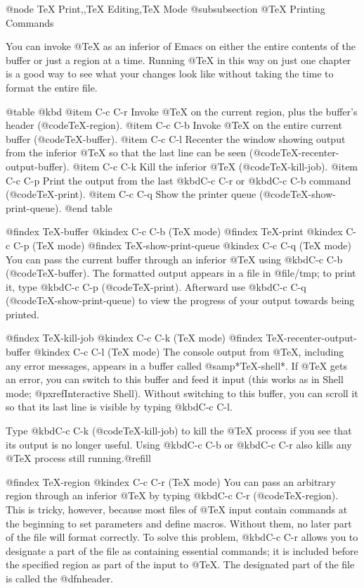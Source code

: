 {{{{{{{{{{{{{{{{{{{{@node TeX Print,,TeX Editing,TeX Mode
@subsubsection @TeX{} Printing Commands

  You can invoke @TeX{} as an inferior of Emacs on either the entire
contents of the buffer or just a region at a time.  Running @TeX{} in
this way on just one chapter is a good way to see what your changes
look like without taking the time to format the entire file.

@table @kbd
@item C-c C-r
Invoke @TeX{} on the current region, plus the buffer's header
(@code{TeX-region}).
@item C-c C-b
Invoke @TeX{} on the entire current buffer (@code{TeX-buffer}).
@item C-c C-l
Recenter the window showing output from the inferior @TeX{} so that
the last line can be seen (@code{TeX-recenter-output-buffer}).
@item C-c C-k
Kill the inferior @TeX{} (@code{TeX-kill-job}).
@item C-c C-p
Print the output from the last @kbd{C-c C-r} or @kbd{C-c C-b} command
(@code{TeX-print}).
@item C-c C-q
Show the printer queue (@code{TeX-show-print-queue}).
@end table

@findex TeX-buffer
@kindex C-c C-b (TeX mode)
@findex TeX-print
@kindex C-c C-p (TeX mode)
@findex TeX-show-print-queue
@kindex C-c C-q (TeX mode)
  You can pass the current buffer through an inferior @TeX{} using
@kbd{C-c C-b} (@code{TeX-buffer}).  The formatted output appears in a file
in @file{/tmp}; to print it, type @kbd{C-c C-p} (@code{TeX-print}).
Afterward use @kbd{C-c C-q} (@code{TeX-show-print-queue}) to view the
progress of your output towards being printed.

@findex TeX-kill-job
@kindex C-c C-k (TeX mode)
@findex TeX-recenter-output-buffer
@kindex C-c C-l (TeX mode)
  The console output from @TeX{}, including any error messages, appears in a
buffer called @samp{*TeX-shell*}.  If @TeX{} gets an error, you can switch
to this buffer and feed it input (this works as in Shell mode;
@pxref{Interactive Shell}).  Without switching to this buffer, you can scroll
it so that its last line is visible by typing @kbd{C-c C-l}.

  Type @kbd{C-c C-k} (@code{TeX-kill-job}) to kill the @TeX{} process if
you see that its output is no longer useful.  Using @kbd{C-c C-b} or
@kbd{C-c C-r} also kills any @TeX{} process still running.@refill

@findex TeX-region
@kindex C-c C-r (TeX mode)
  You can pass an arbitrary region through an inferior @TeX{} by typing
@kbd{C-c C-r} (@code{TeX-region}).  This is tricky, however, because
most files of @TeX{} input contain commands at the beginning to set
parameters and define macros.  Without them, no later part of the file
will format correctly.  To solve this problem, @kbd{C-c C-r} allows you
to designate a part of the file as containing essential commands; it is
included before the specified region as part of the input to @TeX{}.
The designated part of the file is called the @dfn{header}.

}}}}}}}}}}}}}}}}}}}}
